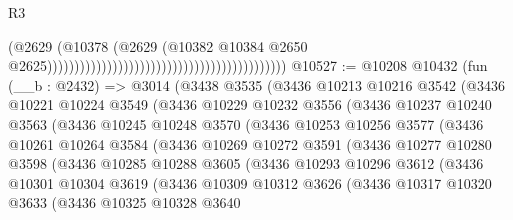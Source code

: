 \begin{lexlean}{R3}
\begin{coremodule}
                                                                                    (@2629
                                                                                      (@10378
                                                                                        (@2629
                                                                                          (@10382
                                                                                            @10384
                                                                                            @2650
                                                                                            @2625))))))))))))))))))))))))))))))))))))))))))))
@10527 := @10208
    @10432
    (fun (__b : @2432) =>
    @3014
      (@3438
        @3535
        (@3436
          @10213
          @10216
          @3542
          (@3436
            @10221
            @10224
            @3549
            (@3436
              @10229
              @10232
              @3556
              (@3436
                @10237
                @10240
                @3563
                (@3436
                  @10245
                  @10248
                  @3570
                  (@3436
                    @10253
                    @10256
                    @3577
                    (@3436
                      @10261
                      @10264
                      @3584
                      (@3436
                        @10269
                        @10272
                        @3591
                        (@3436
                          @10277
                          @10280
                          @3598
                          (@3436
                            @10285
                            @10288
                            @3605
                            (@3436
                              @10293
                              @10296
                              @3612
                              (@3436
                                @10301
                                @10304
                                @3619
                                (@3436
                                  @10309
                                  @10312
                                  @3626
                                  (@3436
                                    @10317
                                    @10320
                                    @3633
                                    (@3436
                                      @10325
                                      @10328
                                      @3640

\end{coremodule}
\end{lexlean}
